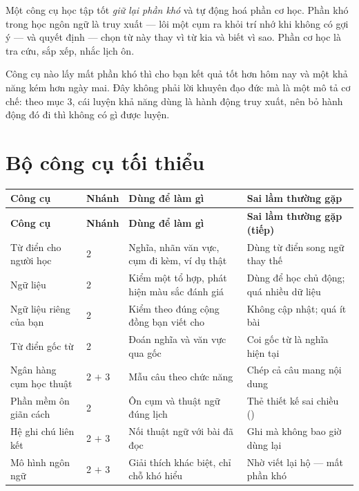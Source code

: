 \documentclass[../../english.tex]{subfiles}
\begin{document}
Một công cụ học tập tốt \emph{giữ lại phần khó} và tự động hoá phần cơ học. Phần khó trong học ngôn ngữ là truy xuất --- lôi một cụm ra khỏi trí nhớ khi không có gợi ý --- và quyết định --- chọn từ này thay vì từ kia và biết vì sao. Phần cơ học là tra cứu, sắp xếp, nhắc lịch ôn.

Công cụ nào lấy mất phần khó thì cho bạn kết quả tốt hơn hôm nay và một khả năng kém hơn ngày mai. Đây không phải lời khuyên đạo đức mà là một mô tả cơ chế: theo  mục 3, cái luyện khả năng dùng là hành động truy xuất, nên bỏ hành động đó đi thì không có gì được luyện.

\section{Bộ công cụ tối thiểu}

\begin{center}\footnotesize
{}
\begin{longtable}{@{}L{3.5cm}L{2.0cm}L{4.4cm}L{4.6cm}@{}}
\toprule
\textbf{Công cụ} & \textbf{Nhánh} & \textbf{Dùng để làm gì} & \textbf{Sai lầm thường gặp}\\
\midrule
\endfirsthead
\toprule
\textbf{Công cụ} & \textbf{Nhánh} & \textbf{Dùng để làm gì} & \textbf{Sai lầm thường gặp (tiếp)}\\
\midrule
\endhead
Từ điển cho người học\cite{oald,ldoce} & 2 & Nghĩa, nhãn văn vực, cụm đi kèm, ví dụ thật & Dùng từ điển song ngữ thay thế\\
Ngữ liệu\cite{coca} & 2 & Kiểm một tổ hợp, phát hiện màu sắc đánh giá & Dùng để học chủ động; quá nhiều dữ liệu\\
Ngữ liệu riêng của bạn & 2 & Kiểm theo đúng cộng đồng bạn viết cho & Không cập nhật; quá ít bài\\
Từ điển gốc từ\cite{etymonline} & 2 & Đoán nghĩa và văn vực qua gốc & Coi gốc từ là nghĩa hiện tại\\
Ngân hàng cụm học thuật\cite{manchesterphrasebank} & 2 \(+\) 3 & Mẫu câu theo chức năng & Chép cả câu mang nội dung\\
Phần mềm ôn giãn cách & 2 & Ôn cụm và thuật ngữ đúng lịch & Thẻ thiết kế sai chiều ()\\
Hệ ghi chú liên kết\cite{ahrens2017} & 2 \(+\) 3 & Nối thuật ngữ với bài đã đọc & Ghi mà không bao giờ dùng lại\\
Mô hình ngôn ngữ & 2 \(+\) 3 & Giải thích khác biệt, chỉ chỗ khó hiểu & Nhờ viết lại hộ --- mất phần khó\\
\bottomrule
\end{longtable}
\end{center}
\end{document}

